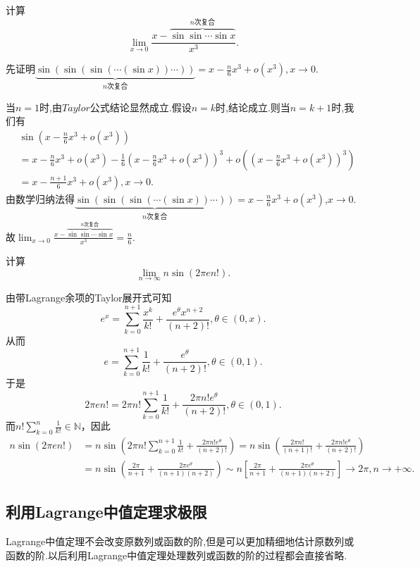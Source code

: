 \documentclass[../../main.tex]{subfiles}
\begin{document}
\begin{example}
计算
\[
\lim_{x\rightarrow 0} \frac{x-\overset{n\text{次复合}}{\overbrace{\sin\sin \cdots \sin x}}}{x^3}.
\]
\end{example}
\begin{solution}
先证明\(\underbrace{\sin(\sin(\sin(\cdots (\sin x))\cdots))}_{n\text{次复合}} = x - \frac{n}{6}x^3 + o(x^3),x\to0\).

当\(n = 1\)时,由$Taylor$公式结论显然成立.假设\(n=k\)时,结论成立.则当\(n=k + 1\)时,我们有
\begin{align*}
&\sin\left(x - \frac{n}{6}x^3 + o(x^3)\right)
\\
&= x - \frac{n}{6}x^3 + o(x^3) - \frac{1}{6}\left(x - \frac{n}{6}x^3 + o(x^3)\right)^3 + o\left(\left(x - \frac{n}{6}x^3 + o(x^3)\right)^3\right)
\\
&= x - \frac{n + 1}{6}x^3 + o(x^3),x\to0.
\end{align*}
由数学归纳法得\(\underbrace{\sin(\sin(\sin(\cdots (\sin x))\cdots))}_{n\text{次复合}} = x - \frac{n}{6}x^3 + o(x^3)\),$x\to0$.
故$\lim_{x\rightarrow 0} \frac{x-\overset{n\text{次复合}}{\overbrace{\sin\sin \cdots \sin x}}}{x^3}=\frac{n}{6}.$
\end{solution}


\begin{example}
计算
\[
\lim_{n\rightarrow \infty}n\sin(2\pi en!).
\]
\end{example}
\begin{solution}
由带Lagrange余项的Taylor展开式可知
\[
e^x = \sum_{k = 0}^{n + 1}\frac{x^k}{k!} + \frac{e^{\theta}x^{n + 2}}{(n + 2)!}, \theta \in (0, x).
\]
从而
\[
e = \sum_{k = 0}^{n + 1}\frac{1}{k!} + \frac{e^{\theta}}{(n + 2)!}, \theta \in (0, 1).
\]
于是
\[
2\pi en! = 2\pi n!\sum_{k = 0}^{n + 1}\frac{1}{k!} + \frac{2\pi n!e^{\theta}}{(n + 2)!}, \theta \in (0, 1).
\]
而\(n!\sum_{k = 0}^n\frac{1}{k!} \in \mathbb{N}\)，因此
\begin{align*}
n\sin(2\pi en!)&=n\sin\left(2\pi n!\sum_{k = 0}^{n + 1}\frac{1}{k!} + \frac{2\pi n!e^{\theta}}{(n + 2)!}\right)
=n\sin\left(\frac{2\pi n!}{(n + 1)!} + \frac{2\pi n!e^{\theta}}{(n + 2)!}\right)\\
&=n\sin\left(\frac{2\pi}{n + 1} + \frac{2\pi e^{\theta}}{(n + 1)(n + 2)}\right)
\sim n\left[\frac{2\pi}{n + 1} + \frac{2\pi e^{\theta}}{(n + 1)(n + 2)}\right] \to 2\pi, n \to +\infty.
\end{align*} 
\end{solution}


\subsection{利用Lagrange中值定理求极限}
Lagrange中值定理不会改变原数列或函数的阶,但是可以更加精细地估计原数列或函数的阶.以后利用Lagrange中值定理处理数列或函数的阶的过程都会直接省略.
\end{document}
